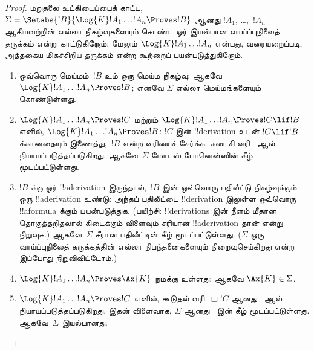 \documentclass[../../../include/open-logic-section]{subfiles}
\begin{document}
\begin{proof}
  மறுதலை உட்கிடைப்பைக் காட்ட,~$\Sigma = \Setabs{!B}{\Log{K} !A_1 \dots
  !A_n \Proves !B }$ ஆனது $!A_1$, \dots,~$!A_n$ ஆகியவற்றின் எல்லா
  நிகழ்வுகளையும் கொண்ட ஓர் இயல்பான வாய்ப்புநிலைத் தருக்கம் என்று காட்டுகிறோம்;
  மேலும் $\Log{K} !A_1 \dots !A_n$ என்பது, வரையறைப்படி, அத்தகைய
  மிகச்சிறிய தருக்கம் என்ற கூற்றைப் பயன்படுத்துகிறோம்.
  \begin{enumerate}
    \item ஒவ்வொரு மெய்மம்~$!B$ உம் ஒரு மெய்ம நிகழ்வு; ஆகவே
      $\Log{K}!A_1\dots!A_n \Proves !B$; எனவே $\Sigma$ எல்லா
      மெய்மங்களையும் கொண்டுள்ளது.
    \item $\Log{K}!A_1\dots!A_n \Proves !C$ மற்றும்
      $\Log{K}!A_1\dots!A_n \Proves !C \lif !B$ எனில்,
      $\Log{K}!A_1\dots!A_n \Proves !B$: $!C$ இன் !!{derivation} உடன்
      $!C \lif !B$ க்கானதையும் இணைத்து,~$!B$ என்ற வரியைச்
      சேர்க்க. கடைசி வரி~\MP{} ஆல் நியாயப்படுத்தப்படுகிறது. ஆகவே~$\Sigma$
      மோடஸ் போனென்ஸின் கீழ் மூடப்பட்டுள்ளது.
    \item $!B$ க்கு ஓர் !!a{derivation} இருந்தால்,~$!B$ இன் ஒவ்வொரு
      பதிலீட்டு நிகழ்வுக்கும் ஒரு !!a{derivation} உண்டு: அந்தப் பதிலீட்டை
      !!{derivation} இலுள்ள ஒவ்வொரு !!a{formula} க்கும் பயன்படுத்துக.
      (பயிற்சி: !!{derivation}s இன் நீளம் மீதான தொகுத்தறிதலால் கிடைக்கும்
      விளைவும் சரியான !!a{derivation} தான் என்று நிறுவுக.) ஆகவே~$\Sigma$
      சீரான பதிலீட்டின் கீழ் மூடப்பட்டுள்ளது. ($\Sigma$ ஒரு வாய்ப்புநிலைத்
      தருக்கத்தின் எல்லா நிபந்தனைகளையும் நிறைவுசெய்கிறது என்று இப்போது
      நிறுவிவிட்டோம்.)
    \item $\Log{K}!A_1\dots!A_n \Proves \Ax{K}$ நமக்கு உள்ளது; ஆகவே
      $\Ax{K} \in \Sigma$.
    \item $\Log{K}!A_1\dots!A_n \Proves !C$ எனில், கூடுதல்
      வரி~$\Box !C$ ஆனது~\Nec{} ஆல் நியாயப்படுத்தப்படுகிறது. இதன் விளைவாக,
      $\Sigma$ ஆனது~\Nec{} இன் கீழ் மூடப்பட்டுள்ளது. ஆகவே~$\Sigma$
      இயல்பானது.
  \end{enumerate}
\end{proof}
\end{document}
